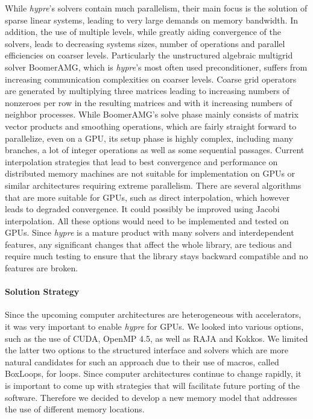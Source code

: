 While {\sl hypre}'s solvers contain much parallelism, their main focus is the solution of sparse linear systems, leading to  very large demands on memory bandwidth. In addition, the use of multiple levels, while greatly aiding convergence of the solvers, leads to decreasing systems sizes, number of operations and parallel efficiencies on coarser levels. Particularly the unstructured algebraic multigrid solver BoomerAMG\cite{HeYa2002}, which is {\sl hypre}'s most often used preconditioner, suffers from increasing communication complexities on coarser levels. Coarse grid operators are generated by multiplying three matrices leading to increasing numbers of nonzeroes per row in the resulting matrices and with it increasing numbers of neighbor processes. While BoomerAMG's solve phase mainly consists of matrix vector products and smoothing operations, which are fairly straight forward to parallelize, even on a GPU, its setup phase is highly complex, including many branches, a lot of integer operations as well as some sequential passages. Current  interpolation strategies that lead to best convergence and performance on distributed memory machines are not suitable for implementation on GPUs or similar architectures requiring extreme parallelism. There are several algorithms that are more suitable for GPUs, such as direct interpolation, which however leads to degraded convergence. It could possibly be improved using Jacobi interpolation. All these options would need to be implemented and tested on GPUs. Since {\sl hypre} is a mature product with many solvers and interdependent features, any significant changes that affect the whole library, are tedious and require much testing to ensure that the library stays backward compatible and no features are broken.

\paragraph{Solution Strategy}

Since the upcoming computer architectures are heterogeneous with accelerators, it was very important to enable {\sl hypre} for GPUs. We looked into various options, such as the use of CUDA, OpenMP 4.5, as well as RAJA and Kokkos. We limited the latter two options to the structured interface and solvers which are more natural candidates for such an approach due to their use of macros, called BoxLoops, for loops.
Since computer architectures continue to change rapidly, it is important to come up with strategies that will facilitate future porting of the software. Therefore we decided to develop a new memory model that addresses the use of different memory locations.

